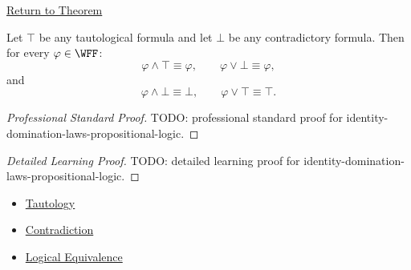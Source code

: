 \newpage
{}
\label{prf:identity-domination-laws-propositional-logic}

\begin{remark*}[Return]
\hyperref[thm:identity-domination-laws-propositional-logic]{Return to Theorem}
\end{remark*}

\begin{theorem*}
Let \(\top\) be any tautological formula and let \(\bot\) be any contradictory formula. Then for every \(\varphi\in\WFF\):
\[
\varphi\land\top\equiv\varphi,
\qquad
\varphi\lor\bot\equiv\varphi,
\]
and
\[
\varphi\land\bot\equiv\bot,
\qquad
\varphi\lor\top\equiv\top.
\]
\end{theorem*}

\begin{proof}[Professional Standard Proof]
\LRAProofBodyStart
TODO: professional standard proof for identity-domination-laws-propositional-logic.
\end{proof}

\begin{proof}[Detailed Learning Proof]
\LRAProofBodyStart
TODO: detailed learning proof for identity-domination-laws-propositional-logic.
\end{proof}

\begin{remark*}
\end{remark*}

\begin{dependencies}
\begin{itemize}
  \item \hyperref[def:tautology-propositional-logic]{Tautology}
  \item \hyperref[def:contradiction-propositional-logic]{Contradiction}
  \item \hyperref[def:logical-equivalence-propositional-logic]{Logical Equivalence}
\end{itemize}
\end{dependencies}

\clearpage
